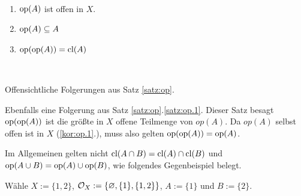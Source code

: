     \begin{kor} \label{kor:op}\ \vspace{0pt}
        \begin{enumerate}
            \item $\text{op}(A)$ ist offen in $X$. \label{kor:op.1}
            \item $\text{op}(A) \subseteq A$ \label{kor:op.2}
            \item $\text{op}(\text{op}(A)) = \text{cl}(A)$ \label{kor:op.3}
        \end{enumerate}
    \end{kor}

    \begin{bew}
        \

        \noindent 
         Offensichtliche Folgerungen aus Satz \ref{satz:op}.%

        \noindent
         Ebenfalls eine Folgerung aus Satz \ref{satz:op}.\ref{satz:op.1}. Dieser Satz besagt $\text{op}(\text{op}(A))$ ist die größte in $X$ offene Teilmenge von $op(A)$. Da $op(A)$ selbst offen ist in $X$ (\ref{kor:op.1}.), muss also gelten $\text{op}(\text{op}(A)) = \text{op}(A)$.

    \end{bew}
    
    Im Allgemeinen gelten nicht ${\text{cl}(A \cap B) = \text{cl}(A) \cap \text{cl}(B)}$ und \\
    ${\text{op}(A \cup B) = \text{op}(A) \cup \text{op}(B)}$, wie folgendes Gegenbeispiel belegt.
    \begin{gegenbsp}
        Wähle ${X := \{1,2\}}$, ${\mathcal{O}_X := \{\varnothing, \{1\}, \{1,2\}\}}$, ${A:= \{1\}}$ und ${B:=\{2\}}$.
    \end{gegenbsp}
    

